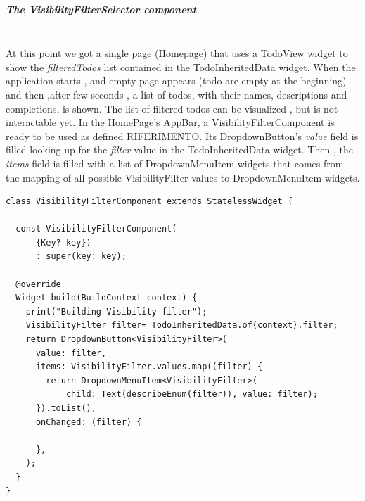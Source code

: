 \subparagraph{The VisibilityFilterSelector component}\mbox{}\\
\label{subpar:todo_app_inherited_widget_visibilityfiltercomponent_component}
At this point we got a single page (Homepage) that uses a TodoView widget to show the \textit{filteredTodos} list contained in the TodoInheritedData widget. When the application starts , and empty page appears (todo are empty at the beginning) and then ,after few seconds , a list of todos, with their names, descriptions and completions, is shown. The list of filtered todos can be visualized , but is not interactable yet. 
In the HomePage’s AppBar, a VisibilityFilterComponent is ready to be used as defined RIFERIMENTO. Its DropdownButton’s \textit{value} field is filled looking up for the \textit{filter} value in the TodoInheritedData widget. Then , the \textit{items} field is filled with a list of DropdownMenuItem widgets that comes from the mapping of all possible VisibilityFilter values to DropdownMenuItem widgets.
\mbox{}\\
\begin{code}

 \mbox{}

\label{code:2.22}
\begin{verbatim}
class VisibilityFilterComponent extends StatelessWidget {

  const VisibilityFilterComponent(
      {Key? key})
      : super(key: key);

  @override
  Widget build(BuildContext context) {
    print("Building Visibility filter");
    VisibilityFilter filter= TodoInheritedData.of(context).filter;
    return DropdownButton<VisibilityFilter>(
      value: filter,
      items: VisibilityFilter.values.map((filter) {
        return DropdownMenuItem<VisibilityFilter>(
            child: Text(describeEnum(filter)), value: filter);
      }).toList(),
      onChanged: (filter) {
        
      },
    );
  }
}
\end{verbatim}
\end{code}
\mbox{}\\
